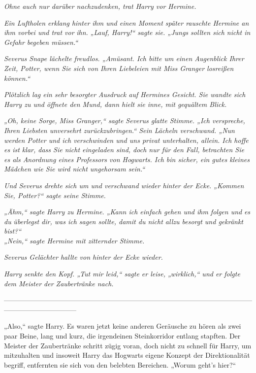 {\emph{Ohne auch nur darüber nachzudenken, trat Harry vor Hermine.}

\emph{Ein Luftholen erklang hinter ihm und einen Moment später rauschte Hermine an ihm vorbei und trat vor} \emph{\emph{ihn.}} \emph{„Lauf, Harry!“ sagte sie. „Jungs sollten sich nicht in Gefahr begeben müssen.“}

\emph{Severus Snape lächelte freudlos. „Amüsant. Ich bitte um einen Augenblick Ihrer Zeit, Potter, wenn Sie sich von Ihren Liebeleien mit Miss Granger losreißen können.“}

\emph{Plötzlich lag ein sehr besorgter Ausdruck auf Hermines Gesicht. Sie wandte sich Harry zu und öffnete den Mund, dann hielt sie inne, mit gequältem Blick.}

\emph{„Oh, keine Sorge, Miss Granger,“ sagte Severus glatte Stimme. „Ich verspreche, Ihren Liebsten unversehrt zurückzubringen.“ Sein Lächeln verschwand. „Nun werden Potter und ich verschwinden und uns privat unterhalten, allein. Ich hoffe es ist klar, dass Sie nicht eingeladen sind, doch nur für den Fall, betrachten Sie es als Anordnung eines Professors von Hogwarts. Ich bin sicher, ein gutes kleines Mädchen wie Sie wird nicht ungehorsam sein.“}

\emph{Und Severus drehte sich um und verschwand wieder hinter der Ecke.} \emph{„Kommen Sie, Potter?“ sagte seine Stimme.}

\emph{„Ähm,“ sagte Harry zu Hermine. „Kann ich einfach gehen und ihm folgen und} \emph{es} \emph{\emph{du}} \emph{überlegst dir, was ich sagen sollte, damit du nicht allzu besorgt und gekränkt bist?“}\\ \emph{„Nein,“ sagte Hermine mit zitternder Stimme.}

\emph{Severus Gelächter hallte von hinter der Ecke wieder.}

\emph{Harry senkte den Kopf. „Tut mir leid,“ sagte er leise, „wirklich,“ und er folgte dem Meister der Zaubertränke nach.}

--------------------------------------------------------------------------------------------------------------------------------------------

\hfill\break „Also,“ sagte Harry. Es waren jetzt keine anderen Geräusche zu hören als zwei paar Beine, lang und kurz, die irgendeinen Steinkorridor entlang stapften. Der Meister der Zaubertränke schritt zügig voran, doch nicht zu schnell für Harry, um mitzuhalten und insoweit Harry das Hogwarts eigene Konzept der Direktionalität begriff, entfernten sie sich von den belebten Bereichen. „Worum geht's hier?“

}
